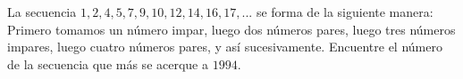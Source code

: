 La secuencia $1, 2, 4, 5, 7, 9 ,10, 12, 14, 16, 17, ... $ se forma de la siguiente manera: Primero tomamos un número impar, luego dos números pares, luego tres números impares, luego cuatro números pares, y así sucesivamente. Encuentre el número de la secuencia que más se acerque a $1994$. 